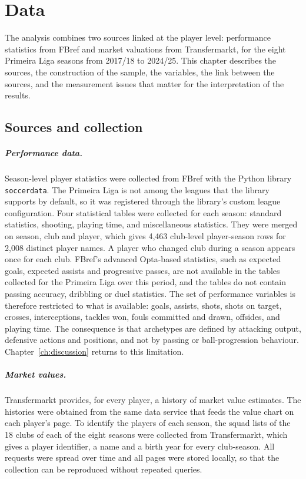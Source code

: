 \chapter{Data}
\label{ch:data}

The analysis combines two sources linked at the player level: performance statistics from FBref and market valuations from Transfermarkt, for the eight Primeira Liga seasons from 2017/18 to 2024/25. This chapter describes the sources, the construction of the sample, the variables, the link between the sources, and the measurement issues that matter for the interpretation of the results.

\section{Sources and collection}
\label{sec:data-sources}

\paragraph{Performance data.} Season-level player statistics were collected from FBref with the Python library \texttt{soccerdata}. The Primeira Liga is not among the leagues that the library supports by default, so it was registered through the library's custom league configuration. Four statistical tables were collected for each season: standard statistics, shooting, playing time, and miscellaneous statistics. They were merged on season, club and player, which gives 4,463 club-level player-season rows for 2,008 distinct player names. A player who changed club during a season appears once for each club. FBref's advanced Opta-based statistics, such as expected goals, expected assists and progressive passes, are not available in the tables collected for the Primeira Liga over this period, and the tables do not contain passing accuracy, dribbling or duel statistics. The set of performance variables is therefore restricted to what is available: goals, assists, shots, shots on target, crosses, interceptions, tackles won, fouls committed and drawn, offsides, and playing time. The consequence is that archetypes are defined by attacking output, defensive actions and positions, and not by passing or ball-progression behaviour. Chapter~\ref{ch:discussion} returns to this limitation.

\paragraph{Market values.} Transfermarkt provides, for every player, a history of market value estimates. The histories were obtained from the same data service that feeds the value chart on each player's page. To identify the players of each season, the squad lists of the 18 clubs of each of the eight seasons were collected from Transfermarkt, which gives a player identifier, a name and a birth year for every club-season. All requests were spread over time and all pages were stored locally, so that the collection can be reproduced without repeated queries.

